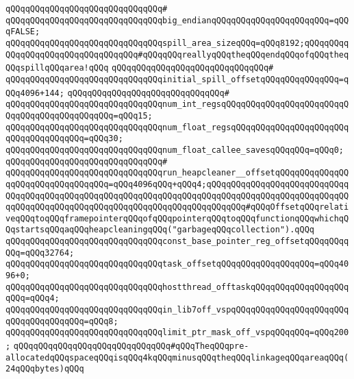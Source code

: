 \verb|qQQqqQQqqQQqqQQqqQQqqQQqqQQqqQQq#|\newline
\verb|qQQqqQQqqQQqqQQqqQQqqQQqqQQqqQQqbig_endianqQQqqQQqqQQqqQQqqQQqqQQq=qQQqFALSE;|\newline
\verb|qQQqqQQqqQQqqQQqqQQqqQQqqQQqqQQqspill_area_sizeqQQq=qQQq8192;qQQqqQQqqQQqqQQqqQQqqQQqqQQqqQQqqQQq#qQQqqQQqreallyqQQqtheqQQqendqQQqofqQQqtheqQQqspillqQQqarea!qQQq|\newline
\verb|qQQqqQQqqQQqqQQqqQQqqQQqqQQqqQQq#|\newline
\verb|qQQqqQQqqQQqqQQqqQQqqQQqqQQqqQQqinitial_spill_offsetqQQqqQQqqQQqqQQq=qQQq4096+144;|\newline
\verb|qQQqqQQqqQQqqQQqqQQqqQQqqQQqqQQq#|\newline
\verb|qQQqqQQqqQQqqQQqqQQqqQQqqQQqqQQqnum_int_regsqQQqqQQqqQQqqQQqqQQqqQQqqQQqqQQqqQQqqQQqqQQqqQQq=qQQq15;|\newline
\verb|qQQqqQQqqQQqqQQqqQQqqQQqqQQqqQQqnum_float_regsqQQqqQQqqQQqqQQqqQQqqQQqqQQqqQQqqQQqqQQq=qQQq30;|\newline
\verb|qQQqqQQqqQQqqQQqqQQqqQQqqQQqqQQqnum_float_callee_savesqQQqqQQq=qQQq0;|\newline
\verb|qQQqqQQqqQQqqQQqqQQqqQQqqQQqqQQq#|\newline
\verb|qQQqqQQqqQQqqQQqqQQqqQQqqQQqqQQqrun_heapcleaner__offsetqQQqqQQqqQQqqQQqqQQqqQQqqQQqqQQqqQQq=qQQq4096qQQq+qQQq4;qQQqqQQqqQQqqQQqqQQqqQQqqQQqqQQqqQQqqQQqqQQqqQQqqQQqqQQqqQQqqQQqqQQqqQQqqQQqqQQqqQQqqQQqqQQqqQQqqQQqqQQqqQQqqQQqqQQqqQQqqQQqqQQqqQQqqQQqqQQqqQQqqQQq#qQQqOffsetqQQqrelativeqQQqtoqQQqframepointerqQQqofqQQqpointerqQQqtoqQQqfunctionqQQqwhichqQQqstartsqQQqaqQQqheapcleaningqQQq("garbageqQQqcollection").qQQq|\newline
\verb|qQQqqQQqqQQqqQQqqQQqqQQqqQQqqQQqconst_base_pointer_reg_offsetqQQqqQQqqQQq=qQQq32764;|\newline
\newline
\verb|qQQqqQQqqQQqqQQqqQQqqQQqqQQqqQQqtask_offsetqQQqqQQqqQQqqQQqqQQq=qQQq4096+0;|\newline
\verb|qQQqqQQqqQQqqQQqqQQqqQQqqQQqqQQqhostthread_offtaskqQQqqQQqqQQqqQQqqQQqqQQq=qQQq4;|\newline
\verb|qQQqqQQqqQQqqQQqqQQqqQQqqQQqqQQqin_lib7off_vspqQQqqQQqqQQqqQQqqQQqqQQqqQQqqQQqqQQqqQQq=qQQq8;|\newline
\verb|qQQqqQQqqQQqqQQqqQQqqQQqqQQqqQQqlimit_ptr_mask_off_vspqQQqqQQq=qQQq200;|\newline
\newline
\verb|qQQqqQQqqQQqqQQqqQQqqQQqqQQqqQQq#qQQqTheqQQqpre-allocatedqQQqspaceqQQqisqQQq4kqQQqminusqQQqtheqQQqlinkageqQQqareaqQQq(24qQQqbytes)qQQq|\newline
